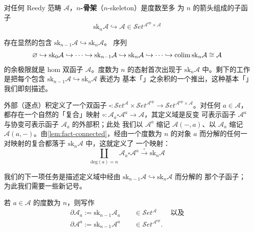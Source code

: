 \begin{definition}\label{def:n-skeleton-hom-bifunctor}
对任何 Reedy 范畴 $\mathcal{A}$，\textbf{$n$-骨架}（$n$-skeleton）是度数至多
为 $n$ 的箭头组成的子函子
\[ \mathrm{sk}_n\mathcal{A}\hookrightarrow\mathcal{A}
   \in\mathcal{S}et^{\mathcal{A}^{\mathrm{op}}\times\mathcal{A}} \]
\end{definition}

存在显然的包含 $\mathrm{sk}_{n-1}\mathcal{A}\hookrightarrow\mathrm{sk}_n\mathcal{A}$。
序列
\[ \varnothing\hookrightarrow\mathrm{sk}_0\mathcal{A}\hookrightarrow\cdots
   \hookrightarrow\mathrm{sk}_{n-1}\mathcal{A}\hookrightarrow\mathrm{sk}_n\mathcal{A}
   \hookrightarrow\cdots\hookrightarrow\operatorname{colim}\mathrm{sk}_n\mathcal{A}\cong\mathcal{A} \]
的余极限就是 hom 双函子 $\mathcal{A}$。度数为 $n$ 的态射首次出现于
$\mathrm{sk}_n\mathcal{A}$ 中。剩下的工作是把每个包含
$\mathrm{sk}_{n-1}\mathcal{A}\hookrightarrow\mathrm{sk}_n\mathcal{A}$ 表述为
基本「\trCell{}」之余积的一个推出，这种基本「\trCell{}」我们即刻描述。

外部（逐点）积定义了一个双函子
$\square\colon\mathcal{S}et^{\mathcal{A}}\times\mathcal{S}et^{\mathcal{A}^{\mathrm{op}}}\to\mathcal{S}et^{\mathcal{A}^{\mathrm{op}}\times\mathcal{A}}$。对任何
$a\in\mathcal{A}$，都存在一个自然的「复合」映射
$\circ\colon\mathcal{A}_a\square\mathcal{A}^{a}\to\mathcal{A}$，其定义域是反变
可表示函子 $\mathcal{A}^{a}$ 与协变可表示函子 $\mathcal{A}_a$ 的外部积；此处
我们以 $\mathcal{A}^{a}$ 缩记 $\mathcal{A}(-,a)$、以 $\mathcal{A}_a$ 缩记
$\mathcal{A}(a,-)$。由\cref{lem:fact-connected}，经由一个度数为 $n$ 的对象 $a$
而分解的任何一对映射的复合都落于 $\mathrm{sk}_n\mathcal{A}$ 中，这就定义了
一个映射：
\[ \coprod_{\mathrm{deg}(a)=n}\mathcal{A}_a\square\mathcal{A}^{a}
   \xrightarrow{\ \circ\ }\mathrm{sk}_n\mathcal{A} \]

我们的下一项任务是描述定义域中经由
$\mathrm{sk}_{n-1}\mathcal{A}\hookrightarrow\mathrm{sk}_n\mathcal{A}$ 而分解的
那个子函子；为此我们需要一些新记号。

\begin{definition}[可表示函子的边缘]\label{def:boundary-representables}
若 $a\in\mathcal{A}$ 的度数为 $n$，则写作
\[ \begin{gathered}
\partial\mathcal{A}_a:=\mathrm{sk}_{n-1}\mathcal{A}_a
   \qquad\in\mathcal{S}et^{\mathcal{A}}\qquad\text{以及}\\
\partial\mathcal{A}^{a}:=\mathrm{sk}_{n-1}\mathcal{A}^{a}
   \qquad\in\mathcal{S}et^{\mathcal{A}^{\mathrm{op}}}.
\end{gathered} \]
\end{definition}

